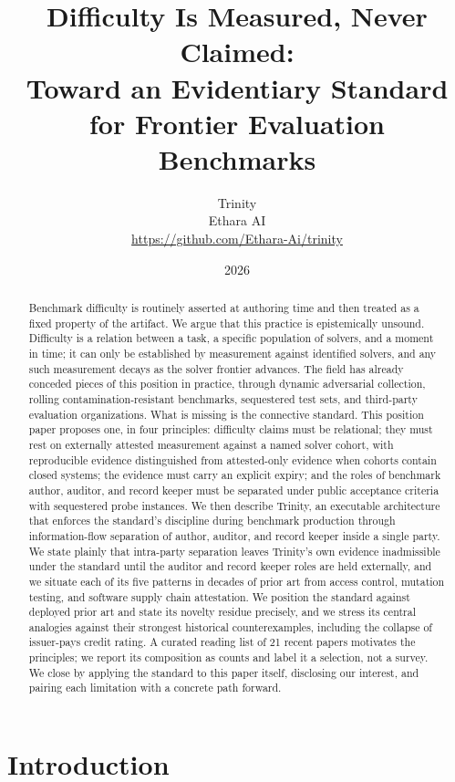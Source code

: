 \documentclass[11pt]{article}
\title{Difficulty Is Measured, Never Claimed:\\Toward an Evidentiary Standard for Frontier Evaluation Benchmarks}
\author{Trinity\\Ethara AI\\\small\url{https://github.com/Ethara-Ai/trinity}}
\date{2026}
\begin{document}
\maketitle

\begin{abstract}
Benchmark difficulty is routinely asserted at authoring time and then treated as a fixed property of the artifact. We argue that this practice is epistemically unsound. Difficulty is a relation between a task, a specific population of solvers, and a moment in time; it can only be established by measurement against identified solvers, and any such measurement decays as the solver frontier advances. The field has already conceded pieces of this position in practice, through dynamic adversarial collection, rolling contamination-resistant benchmarks, sequestered test sets, and third-party evaluation organizations. What is missing is the connective standard. This position paper proposes one, in four principles: difficulty claims must be relational; they must rest on externally attested measurement against a named solver cohort, with reproducible evidence distinguished from attested-only evidence when cohorts contain closed systems; the evidence must carry an explicit expiry; and the roles of benchmark author, auditor, and record keeper must be separated under public acceptance criteria with sequestered probe instances. We then describe Trinity, an executable architecture that enforces the standard's discipline during benchmark production through information-flow separation of author, auditor, and record keeper inside a single party. We state plainly that intra-party separation leaves Trinity's own evidence inadmissible under the standard until the auditor and record keeper roles are held externally, and we situate each of its five patterns in decades of prior art from access control, mutation testing, and software supply chain attestation. We position the standard against deployed prior art and state its novelty residue precisely, and we stress its central analogies against their strongest historical counterexamples, including the collapse of issuer-pays credit rating. A curated reading list of 21 recent papers motivates the principles; we report its composition as counts and label it a selection, not a survey. We close by applying the standard to this paper itself, disclosing our interest, and pairing each limitation with a concrete path forward.
\end{abstract}

\section{Introduction}
\label{sec:introduction}
\end{document}
